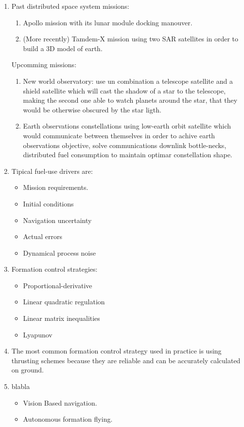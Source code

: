 \documentclass[a4paper]{article}
\begin{document}
\begin{enumerate}[label=\emph{\alph*)},series=preguntas1_1]
  \item Past distributed space system missions:
    \begin{enumerate}[label=\arabic*., series=pregunta4]
      \item Apollo mission with its lunar module docking manouver.
      \item (More recently) Tamdem-X mission using two SAR satellites in order to build a 3D model of earth.
    \end{enumerate}

    Upcomming missions:
    \begin{enumerate}[resume*=pregunta4]
      \item New world observatory: use un combination a telescope satellite and a shield satellite which will cast the shadow of a star to the telescope, making the second one able to watch planets around the star, that they would be otherwise obscured by the star ligth.
      \item Earth observations constellations using low-earth orbit satellite which would communicate between themselves in order to achive earth observations objective, solve communications downlink bottle-necks, distributed fuel consumption to maintain optimar constellation shape.
    \end{enumerate}

  \item Tipical fuel-use drivers are:
  \begin{itemize}
    \item Mission requirements.
    \item Initial conditions
    \item Navigation uncertainty
    \item Actual errors
    \item Dynamical process noise
  \end{itemize}

  \item Formation control strategies:
  \begin{itemize}
    \item Proportional-derivative
    \item Linear quadratic regulation
    \item Linear matrix inequalities
    \item Lyapunov
  \end{itemize}

  \item The most common formation control strategy used in practice is using thrusting schemes because they are reliable and can be accurately calculated on ground. 

  \item blabla
    \begin{itemize}
      \item Vision Based navigation.
      \item Autonomous formation flying. 
   \end{itemize}

\end{enumerate}
\end{document}
